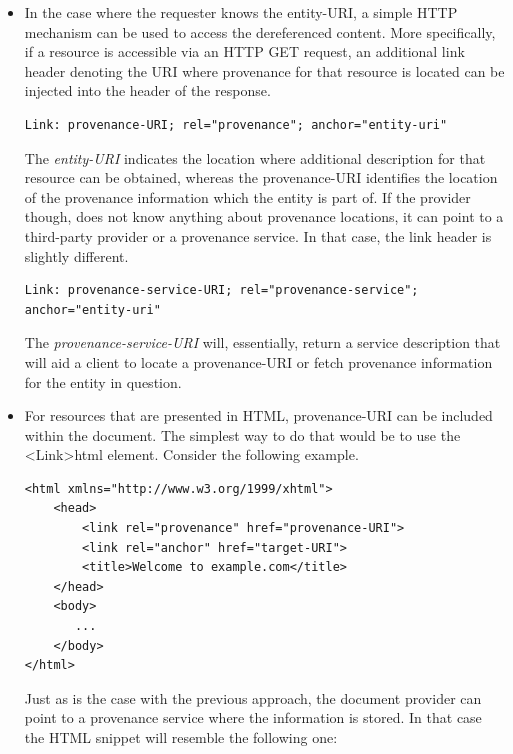\begin{itemize}
  \item
        In the case where the requester knows the entity-URI, a simple HTTP mechanism can be used to access the dereferenced content. More specifically, if a resource is accessible via an HTTP GET request, an additional link header denoting the URI where provenance for that resource is located can be injected into the header of the response.

\begin{verbatim}
Link: provenance-URI; rel="provenance"; anchor="entity-uri"
\end{verbatim}

        The \emph{entity-URI} indicates the location where additional description for that resource can be obtained, whereas the provenance-URI identifies the location of the provenance information which the entity is part of. If the provider though, does not know anything about provenance locations, it can point to a third-party provider or a provenance service. In that case, the link header is slightly different.

\begin{verbatim}
Link: provenance-service-URI; rel="provenance-service";
anchor="entity-uri"
\end{verbatim}

        The \emph{provenance-service-URI} will, essentially, return a service description that will aid a client to locate a provenance-URI or fetch provenance information for the entity in question.

  \item
        For resources that are presented in HTML, provenance-URI can be included within the document. The simplest way to do that would be to use the \textless Link\textgreater html element. Consider the following example.

\begin{verbatim}
<html xmlns="http://www.w3.org/1999/xhtml">
    <head>
        <link rel="provenance" href="provenance-URI">
        <link rel="anchor" href="target-URI">
        <title>Welcome to example.com</title>
    </head>
    <body>
       ...
    </body>
</html>
\end{verbatim}

        Just as is the case with the previous approach, the document provider can point to a provenance service where the information is stored. In that case the HTML snippet will resemble the following one:


\end{itemize}
